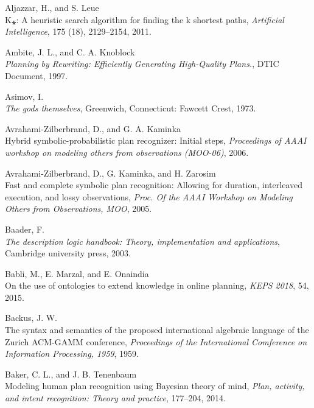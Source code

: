 \documentclass[11pt,a4paper,twoside,openright,titlepage,numbers=noenddot,headinclude,cleardoublepage=empty,openany]{scrreprt}
\theoremstyle{plain}
\theoremstyle{definition}
\theoremstyle{remark}
\begin{document}
\leavevmode\hypertarget{ref-aljazzar_heuristic_2011}{}%
Aljazzar, H., and S. Leue\\
K⁎: A heuristic search algorithm for finding the k shortest paths,
\emph{Artificial Intelligence}, 175 (18), 2129--2154, 2011.

\leavevmode\hypertarget{ref-ambite_planning_1997}{}%
Ambite, J. L., and C. A. Knoblock\\
\emph{Planning by Rewriting: Efficiently Generating High-Quality
Plans.}, DTIC Document, 1997.

\leavevmode\hypertarget{ref-asimov_gods_1973}{}%
Asimov, I.\\
\emph{The gods themselves}, Greenwich, Connecticut: Fawcett Crest, 1973.

\leavevmode\hypertarget{ref-avrahami-zilberbrand_hybrid_2006}{}%
Avrahami-Zilberbrand, D., and G. A. Kaminka\\
Hybrid symbolic-probabilistic plan recognizer: Initial steps,
\emph{Proceedings of AAAI workshop on modeling others from observations
(MOO-06)}, 2006.

\leavevmode\hypertarget{ref-avrahami-zilberbrand_fast_2005b}{}%
Avrahami-Zilberbrand, D., G. Kaminka, and H. Zarosim\\
Fast and complete symbolic plan recognition: Allowing for duration,
interleaved execution, and lossy observations, \emph{Proc. Of the AAAI
Workshop on Modeling Others from Observations, MOO}, 2005.

\leavevmode\hypertarget{ref-baader_description_2003}{}%
Baader, F.\\
\emph{The description logic handbook: Theory, implementation and
applications}, Cambridge university press, 2003.

\leavevmode\hypertarget{ref-babli_use_2015}{}%
Babli, M., E. Marzal, and E. Onaindia\\
On the use of ontologies to extend knowledge in online planning,
\emph{KEPS 2018}, 54, 2015.

\leavevmode\hypertarget{ref-backus_syntax_1959}{}%
Backus, J. W.\\
The syntax and semantics of the proposed international algebraic
language of the Zurich ACM-GAMM conference, \emph{Proceedings of the
International Comference on Information Processing, 1959}, 1959.

\leavevmode\hypertarget{ref-baker_modeling_2014}{}%
Baker, C. L., and J. B. Tenenbaum\\
Modeling human plan recognition using Bayesian theory of mind,
\emph{Plan, activity, and intent recognition: Theory and practice},
177--204, 2014.
\end{document}
